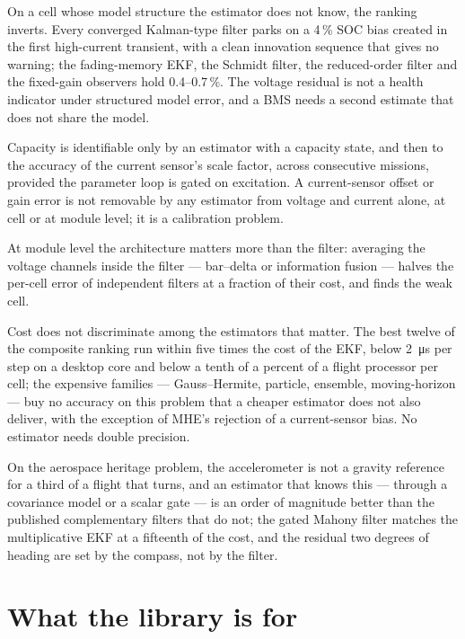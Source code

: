 On a cell whose model structure the estimator does not know, the ranking inverts. Every
converged Kalman-type filter parks on a \num{4}\,\% SOC bias created in the first high-current
transient, with a clean innovation sequence that gives no warning; the fading-memory EKF, the
Schmidt filter, the reduced-order filter and the fixed-gain observers hold \num{0.4}--\num{0.7}\,\%.
The voltage residual is not a health indicator under structured model error, and a BMS needs
a second estimate that does not share the model.

Capacity is identifiable only by an estimator with a capacity state, and then to the accuracy
of the current sensor's scale factor, across consecutive missions, provided the parameter
loop is gated on excitation. A current-sensor offset or gain error is not removable by any
estimator from voltage and current alone, at cell or at module level; it is a calibration
problem.

At module level the architecture matters more than the filter: averaging the voltage channels
inside the filter --- bar--delta or information fusion --- halves the per-cell error of
independent filters at a fraction of their cost, and finds the weak cell.

Cost does not discriminate among the estimators that matter. The best twelve of the composite
ranking run within five times the cost of the EKF, below \SI{2}{\micro\second} per step on a
desktop core and below a tenth of a percent of a flight processor per cell; the expensive
families --- Gauss--Hermite, particle, ensemble, moving-horizon --- buy no accuracy on this
problem that a cheaper estimator does not also deliver, with the exception of MHE's rejection
of a current-sensor bias. No estimator needs double precision.

On the aerospace heritage problem, the accelerometer is not a gravity reference for a third of a
flight that turns, and an estimator that knows this --- through a covariance model or a scalar
gate --- is an order of magnitude better than the published complementary filters that do not;
the gated Mahony filter matches the multiplicative EKF at a fifteenth of the cost, and the
residual two degrees of heading are set by the compass, not by the filter.

\section{What the library is for}

